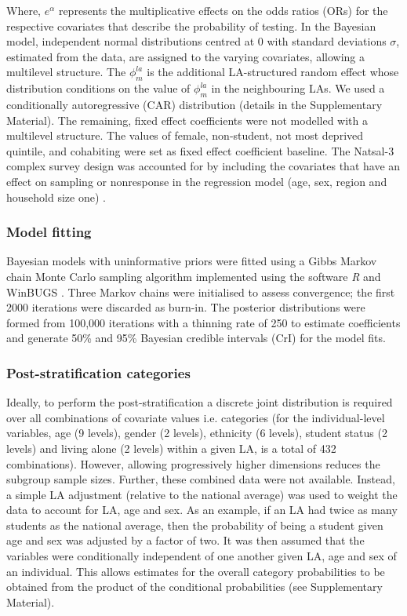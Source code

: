 \documentclass[fleqn,10pt]{wlscirep}
\begin{document}
Where, $e^{\alpha}$ represents the multiplicative effects on the odds ratios (ORs) for the respective covariates that describe the probability of testing. In the Bayesian model, independent normal distributions centred at 0 with standard deviations $\sigma$, estimated from the data, are assigned to the varying covariates, allowing a multilevel structure. The $\phi_m^{la}$ is the additional LA-structured random effect whose distribution conditions on the value of $\phi_m^{la}$ in the neighbouring LAs. We used a conditionally autoregressive (CAR) distribution (details in the Supplementary Material). The remaining, fixed effect coefficients were not modelled with a multilevel structure. The values of female, non-student, not most deprived quintile, and cohabiting were set as fixed effect coefficient baseline.
The Natsal-3 complex survey design was accounted for by including the covariates that have an effect on sampling or nonresponse in the regression model (age, sex, region and household size one) \cite{Gelman2007b}.

\subsubsection*{Model fitting}
Bayesian models with uninformative priors were fitted using a Gibbs Markov chain Monte Carlo sampling algorithm implemented using the software {\it R} \cite{RCoreTeam2017} and WinBUGS \cite{Lunn2000}. Three Markov chains were initialised to assess convergence; the first 2000 iterations were discarded as burn-in. The posterior distributions were formed from 100,000 iterations with a thinning rate of 250 to estimate coefficients and generate 50\% and 95\% Bayesian credible intervals (CrI) for the model fits.

\subsubsection*{Post-stratification categories}
Ideally, to perform the post-stratification a discrete joint distribution is required over all combinations of covariate values i.e. categories (for the individual-level variables, age (9 levels), gender (2 levels), ethnicity (6 levels), student status (2 levels) and living alone (2 levels) within a given LA, is a total of 432 combinations). However, allowing progressively higher dimensions reduces the subgroup sample sizes. Further, these combined data were not available. Instead, a simple LA adjustment (relative to the national average) was used to weight the data to account for LA, age and sex. As an example, if an LA had twice as many students as the national average, then the probability of being a student given age and sex was adjusted by a factor of two.
It was then assumed that the variables were conditionally independent of one another given LA, age and sex of an individual. This allows estimates for the overall category probabilities to be obtained from the product of the conditional probabilities (see Supplementary Material). 
\end{document}
